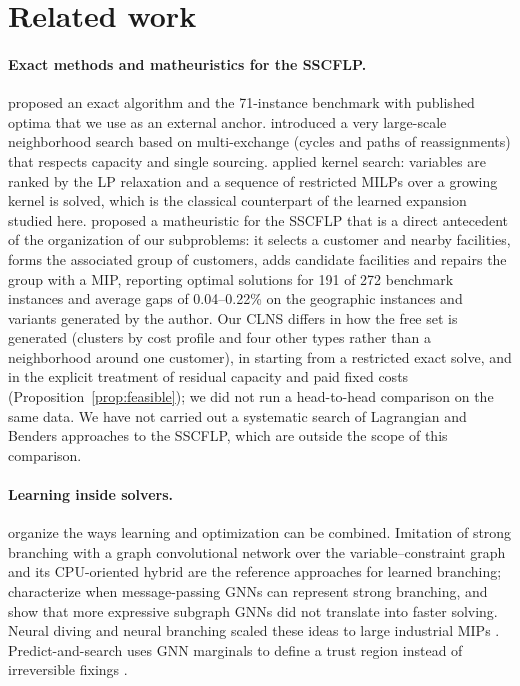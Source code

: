 \section{Related work}\label{sec:related}

\paragraph{Exact methods and matheuristics for the SSCFLP.}
\citet{holmberg1999} proposed an exact algorithm and the 71-instance benchmark with published
optima that we use as an external anchor. \citet{ahuja2004} introduced a very large-scale
neighborhood search based on multi-exchange (cycles and paths of reassignments) that respects
capacity and single sourcing. \citet{guastaroba2014} applied kernel search: variables are ranked
by the LP relaxation and a sequence of restricted MILPs over a growing kernel is solved, which is
the classical counterpart of the learned expansion studied here. \citet{kong2021} proposed a
matheuristic for the SSCFLP that is a direct antecedent of the organization of our subproblems:
it selects a customer and nearby facilities, forms the associated group of customers, adds
candidate facilities and repairs the group with a MIP, reporting optimal solutions for 191 of 272
benchmark instances and average gaps of 0.04--0.22\% on the geographic instances and variants
generated by the author. Our CLNS differs in how the free set is generated (clusters by cost
profile and four other types rather than a neighborhood around one customer), in starting from a
restricted exact solve, and in the explicit treatment of residual capacity and paid fixed costs
(Proposition~\ref{prop:feasible}); we did not run a head-to-head comparison on the same data. We
have not carried out a systematic search of Lagrangian and Benders approaches to the SSCFLP,
which are outside the scope of this comparison.

\paragraph{Learning inside solvers.}
\citet{bengio2021} organize the ways learning and optimization can be combined. Imitation of
strong branching with a graph convolutional network over the variable--constraint graph
\citep{gasse2019} and its CPU-oriented hybrid \citep{gupta2020} are the reference approaches for
learned branching; \citet{chen2025gnnbranching} characterize when message-passing GNNs can
represent strong branching, and \citet{zhou2025subgraph} show that more expressive subgraph GNNs
did not translate into faster solving. Neural diving and neural branching scaled these ideas to
large industrial MIPs \citep{nair2020}. Predict-and-search uses GNN marginals to define a trust
region instead of irreversible fixings \citep{han2023}.

